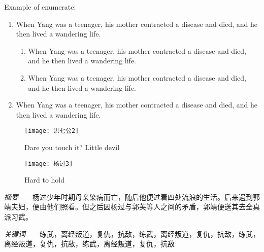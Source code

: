 \documentclass[doctor, vlined]{DissertUESTC}
\begin{document}
	\null

	Example of enumerate:

	\begin{enumerate}
		\item When Yang was a teenager, his mother contracted a disease and died, and he then lived a wandering life.
		\begin{enumerate}
			\item When Yang was a teenager, his mother contracted a disease and died, and he then lived a wandering life.
			\item When Yang was a teenager, his mother contracted a disease and died, and he then lived a wandering life.
		\end{enumerate}
		\item When Yang was a teenager, his mother contracted a disease and died, and he then lived a wandering life.
	\end{enumerate}
	

	\begin{figure}[!htb]
		\centering
		\texttt{[image: 洪七公2]}
		\captionsetup{list=no}%
		\caption{Dare you touch it? Little devil}
	\end{figure}
	
	\begin{figure}[!htb]
		\centering
		\texttt{[image: 杨过3]}
		\captionsetup{list=no}%
		\caption{Hard to hold}
	\end{figure}




	\textit{摘要}——杨过少年时期母亲染病而亡，随后他便过着四处流浪的生活。后来遇到郭靖夫妇，便由他们照看。但之后因杨过与郭芙等人之间的矛盾，郭靖便送其去全真派习武。

	\textit{关键词}——练武，离经叛道，复仇，抗敌，练武，离经叛道，复仇，抗敌，练武，离经叛道，复仇，抗敌，练武，离经叛道，复仇，抗敌

\end{document}
